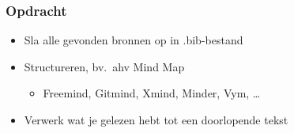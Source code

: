 \documentclass[aspectratio=169]{beamer}
\begin{document}
\begin{frame}
  \frametitle{Opdracht}

  \begin{itemize}
    \item Sla alle gevonden bronnen op in .bib-bestand
    \item Structureren, bv.\ ahv Mind Map
      \begin{itemize}
        \item Freemind, Gitmind, Xmind, Minder, Vym, \ldots
      \end{itemize}
    \item Verwerk wat je gelezen hebt tot een doorlopende tekst
  \end{itemize}

  \bigskip

\end{frame}
\end{document}
